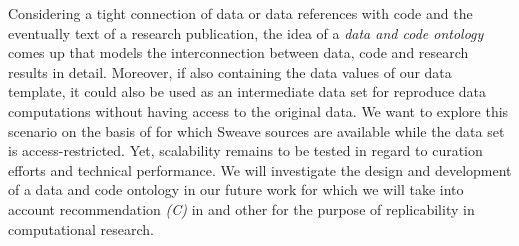 \documentclass{acm_proc_article-sp}
\begin{document}
Considering a tight connection of data or data references with code and the eventually text of a research publication, the idea of a \textit{data and code ontology} comes up that models the interconnection between data, code and research results in detail. 
Moreover, if also containing the data values of our data template, it could also be used as an intermediate data set for reproduce data computations without having access to the original data.
We want to explore this scenario on the basis of \cite{arai2011fragile} for which Sweave sources are available while the data set is access-restricted.
Yet, scalability remains to be tested in regard to curation efforts and technical performance.
We will investigate the design and development of a data and code ontology in our future work for which we will take into account recommendation \textit{(C)} in \cite{RePEc_ejw_journl_v_4_y_2007_i_3_p_326_337} and other
%
%
\cite{KoenkerZeileis2009} 
%
\cite{baiocchi2007reproducible}
%
\cite{gentleman2007statistical}
%
\cite{rahmandad2012reporting}
for the purpose of replicability in computational research.


%
%
%



%
%
%
%
%
%









\balancecolumns






 
\end{document}
